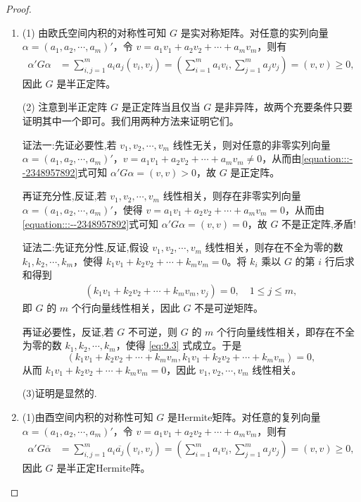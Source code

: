\documentclass[../../main.tex]{subfiles}
\begin{document}
\begin{proof}
\begin{enumerate}
\item (1) 由欧氏空间内积的对称性可知 $G$ 是实对称矩阵。对任意的实列向量 $\alpha=(a_1,a_2,\cdots,a_m)'$，令 $v = a_1v_1 + a_2v_2 + \cdots + a_mv_m$，则有
\begin{align}\label{equation:::--2348957892}
\alpha'G\alpha&=\sum_{i,j = 1}^{m}a_ia_j(v_i,v_j)=(\sum_{i = 1}^{m}a_iv_i,\sum_{j = 1}^{m}a_jv_j)=(v,v)\geqslant 0,
\end{align}
因此 $G$ 是半正定阵。

(2) 注意到半正定阵 $G$ 是正定阵当且仅当 $G$ 是非异阵，故两个充要条件只要证明其中一个即可。我们用两种方法来证明它们。

{\color{blue}证法一:}先证必要性,若 $v_1,v_2,\cdots,v_m$ 线性无关，则对任意的非零实列向量 $\alpha=(a_1,a_2,\cdots,a_m)'$，$v = a_1v_1 + a_2v_2 + \cdots + a_mv_m\neq0$，从而由\eqref{equation:::--2348957892}式可知 $\alpha'G\alpha=(v,v)>0$，故 $G$ 是正定阵。

再证充分性,反证,若 $v_1,v_2,\cdots,v_m$ 线性相关，则存在非零实列向量 $\alpha=(a_1,a_2,\cdots,a_m)'$，使得 $v = a_1v_1 + a_2v_2 + \cdots + a_mv_m = 0$，从而由\eqref{equation:::--2348957892}式可知 $\alpha'G\alpha=(v,v)=0$，故 $G$ 不是正定阵,矛盾!

{\color{blue}证法二:}先证充分性,反证,假设 $v_1,v_2,\cdots,v_m$ 线性相关，则存在不全为零的数 $k_1,k_2,\cdots,k_m$，使得 $k_1v_1 + k_2v_2 + \cdots + k_mv_m = 0$。将 $k_i$ 乘以 $G$ 的第 $i$ 行后求和得到
\begin{align}
(k_1v_1 + k_2v_2 + \cdots + k_mv_m,v_j)=0,\quad 1\leqslant  j\leqslant  m,\label{eq:9.3}
\end{align}
即 $G$ 的 $m$ 个行向量线性相关，因此 $G$ 不是可逆矩阵。

再证必要性，反证,若 $G$ 不可逆，则 $G$ 的 $m$ 个行向量线性相关，即存在不全为零的数 $k_1,k_2,\cdots,k_m$，使得 \eqref{eq:9.3} 式成立。于是
\[
(k_1v_1 + k_2v_2 + \cdots + k_mv_m,k_1v_1 + k_2v_2 + \cdots + k_mv_m)=0,
\]
从而 $k_1v_1 + k_2v_2 + \cdots + k_mv_m = 0$，因此 $v_1,v_2,\cdots,v_m$ 线性相关。

(3)证明是显然的.

\item (1)由酉空间内积的对称性可知 $G$ 是Hermite矩阵。对任意的复列向量 $\alpha=(a_1,a_2,\cdots,a_m)'$，令 $v = a_1v_1 + a_2v_2 + \cdots + a_mv_m$，则有
\begin{align}\label{equation:::--234895789}
\alpha'G \overline{\alpha}&=\sum_{i,j = 1}^{m}a_i\overline{a_j}(v_i,v_j)=(\sum_{i = 1}^{m}a_iv_i,\sum_{j = 1}^{m}a_jv_j)=(v,v)\geqslant 0,
\end{align}
因此 $G$ 是半正定Hermite阵。


\end{enumerate}
\end{proof}
\end{document}
